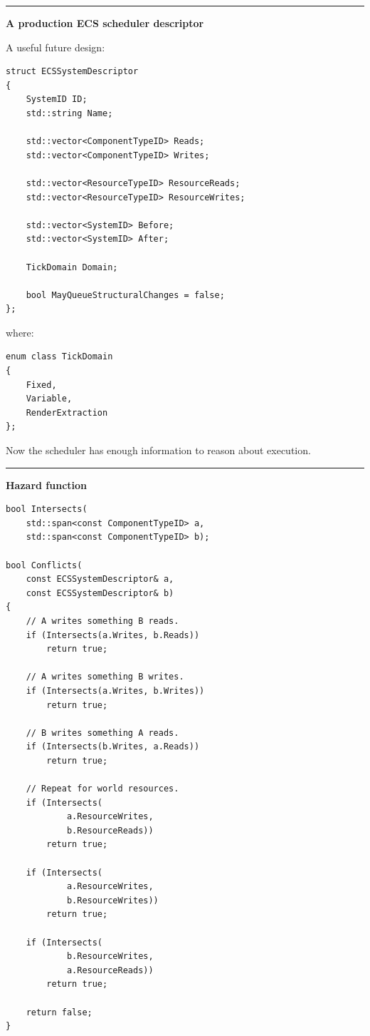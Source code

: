 \begin{center}\rule{0.5\linewidth}{0.5pt}\end{center}

\textbf{A production ECS scheduler descriptor}

A useful future design:

\begin{verbatim}
struct ECSSystemDescriptor
{
    SystemID ID;
    std::string Name;

    std::vector<ComponentTypeID> Reads;
    std::vector<ComponentTypeID> Writes;

    std::vector<ResourceTypeID> ResourceReads;
    std::vector<ResourceTypeID> ResourceWrites;

    std::vector<SystemID> Before;
    std::vector<SystemID> After;

    TickDomain Domain;

    bool MayQueueStructuralChanges = false;
};
\end{verbatim}

where:

\begin{verbatim}
enum class TickDomain
{
    Fixed,
    Variable,
    RenderExtraction
};
\end{verbatim}

Now the scheduler has enough information to reason about execution.

\begin{center}\rule{0.5\linewidth}{0.5pt}\end{center}

\textbf{Hazard function}

\begin{verbatim}
bool Intersects(
    std::span<const ComponentTypeID> a,
    std::span<const ComponentTypeID> b);

bool Conflicts(
    const ECSSystemDescriptor& a,
    const ECSSystemDescriptor& b)
{
    // A writes something B reads.
    if (Intersects(a.Writes, b.Reads))
        return true;

    // A writes something B writes.
    if (Intersects(a.Writes, b.Writes))
        return true;

    // B writes something A reads.
    if (Intersects(b.Writes, a.Reads))
        return true;

    // Repeat for world resources.
    if (Intersects(
            a.ResourceWrites,
            b.ResourceReads))
        return true;

    if (Intersects(
            a.ResourceWrites,
            b.ResourceWrites))
        return true;

    if (Intersects(
            b.ResourceWrites,
            a.ResourceReads))
        return true;

    return false;
}
\end{verbatim}

